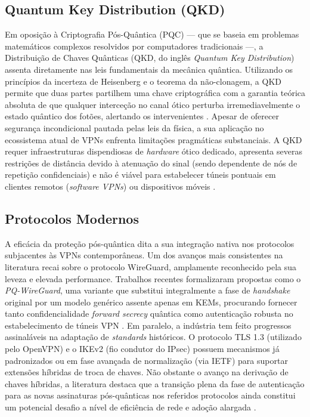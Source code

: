 \documentclass[runningheads]{llncs}
\begin{document}
\subsection{Quantum Key Distribution (QKD)}
Em oposição à Criptografia Pós-Quântica (PQC) --- que se baseia em problemas matemáticos complexos resolvidos por computadores tradicionais ---, a Distribuição de Chaves Quânticas (QKD, do inglês \textit{Quantum Key Distribution}) assenta diretamente nas leis fundamentais da mecânica quântica. Utilizando os princípios da incerteza de Heisenberg e o teorema da não-clonagem, a QKD permite que duas partes partilhem uma chave criptográfica com a garantia teórica absoluta de que qualquer interceção no canal ótico perturba irremediavelmente o estado quântico dos fotões, alertando os intervenientes \cite{article}. Apesar de oferecer segurança incondicional pautada pelas leis da física, a sua aplicação no ecossistema atual de VPNs enfrenta limitações pragmáticas substanciais. A QKD requer infraestruturas dispendiosas de \textit{hardware} ótico dedicado, apresenta severas restrições de distância devido à atenuação do sinal (sendo dependente de nós de repetição confidenciais) e não é viável para estabelecer túneis pontuais em clientes remotos (\textit{software VPNs}) ou dispositivos móveis \cite{kundu2026postquantumcryptographicanalysismessage}.

\subsection{Protocolos Modernos}
A eficácia da proteção pós-quântica dita a sua integração nativa nos protocolos subjacentes às VPNs contemporâneas. Um dos avanços mais consistentes na literatura recai sobre o protocolo WireGuard, amplamente reconhecido pela sua leveza e elevada performance. Trabalhos recentes formalizaram propostas como o \textit{PQ-WireGuard}, uma variante que substitui integralmente a fase de \textit{handshake} original por um modelo genérico assente apenas em KEMs, procurando fornecer tanto confidencialidade \textit{forward secrecy} quântica como autenticação robusta no estabelecimento de túneis VPN \cite{cryptoeprint:2020/379,10827179}. Em paralelo, a indústria tem feito progressos assinaláveis na adaptação de \textit{standards} históricos. O protocolo TLS 1.3 (utilizado pelo OpenVPN) e o IKEv2 (fio condutor do IPsec) possuem mecanismos já padronizados ou em fase avançada de normalização (via IETF) para suportar extensões híbridas de troca de chaves. Não obstante o avanço na derivação de chaves híbridas, a literatura destaca que a transição plena da fase de autenticação para as novas assinaturas pós-quânticas nos referidos protocolos ainda constitui um potencial desafio a nível de eficiência de rede e adoção alargada \cite{mallick2026studypostquantumstatus,cryptoeprint:2020/071}.
\end{document}
